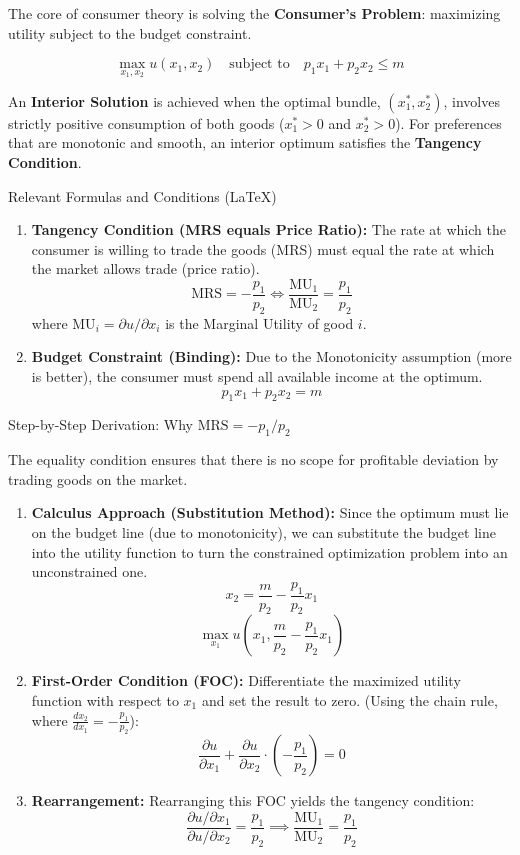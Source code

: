 \documentclass{article}
\begin{document}
The core of consumer theory is solving the \textbf{Consumer's Problem}: maximizing utility subject to the budget constraint.

\[\max_{x_1, x_2} u(x_1, x_2) \quad \text{subject to} \quad p_1 x_1 + p_2 x_2 \leq m\]

An \textbf{Interior Solution} is achieved when the optimal bundle, $(x_1^*, x_2^*)$, involves strictly positive consumption of both goods ($x_1^* > 0$ and $x_2^* > 0$). For preferences that are monotonic and smooth, an interior optimum satisfies the \textbf{Tangency Condition}.

\noindent Relevant Formulas and Conditions (LaTeX)
\begin{enumerate}
    \item \textbf{Tangency Condition (MRS equals Price Ratio):} The rate at which the consumer is willing to trade the goods (MRS) must equal the rate at which the market allows trade (price ratio).
    \[\text{MRS} = -\frac{p_1}{p_2} \iff \frac{\text{MU}_1}{\text{MU}_2} = \frac{p_1}{p_2}\]
    where $\text{MU}_i = \partial u / \partial x_i$ is the Marginal Utility of good $i$.

    \item \textbf{Budget Constraint (Binding):} Due to the Monotonicity assumption (more is better), the consumer must spend all available income at the optimum.
    \[p_1 x_1 + p_2 x_2 = m\]
\end{enumerate}

\noindent Step-by-Step Derivation: Why $\text{MRS} = -p_1/p_2$

The equality condition ensures that there is no scope for profitable deviation by trading goods on the market.
\begin{enumerate}
    \item \textbf{Calculus Approach (Substitution Method):} Since the optimum must lie on the budget line (due to monotonicity), we can substitute the budget line into the utility function to turn the constrained optimization problem into an unconstrained one.
    \[x_2 = \frac{m}{p_2} - \frac{p_1}{p_2} x_1\]
    \[\max_{x_1} u\left(x_1, \frac{m}{p_2} - \frac{p_1}{p_2} x_1\right)\]

    \item \textbf{First-Order Condition (FOC):} Differentiate the maximized utility function with respect to $x_1$ and set the result to zero. (Using the chain rule, where $\frac{dx_2}{dx_1} = -\frac{p_1}{p_2}$):
    \[\frac{\partial u}{\partial x_1} + \frac{\partial u}{\partial x_2} \cdot \left( -\frac{p_1}{p_2} \right) = 0\]

    \item \textbf{Rearrangement:} Rearranging this FOC yields the tangency condition:
    \[\frac{\partial u / \partial x_1}{\partial u / \partial x_2} = \frac{p_1}{p_2} \implies \frac{\text{MU}_1}{\text{MU}_2} = \frac{p_1}{p_2}\]
\end{enumerate}
\end{document}
